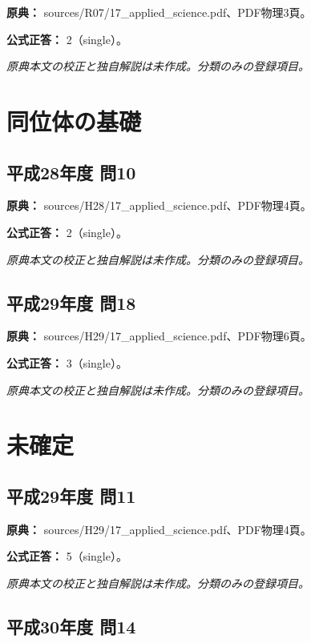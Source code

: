 \noindent\textbf{原典：} sources/R07/17\_applied\_science.pdf、PDF物理3頁。

\textbf{公式正答：} 2（single）。

\par\textit{原典本文の校正と独自解説は未作成。分類のみの登録項目。}

\section{同位体の基礎}

\subsection{平成28年度 問10}
\label{q:h28-reg-applied-10}

\noindent\textbf{原典：} sources/H28/17\_applied\_science.pdf、PDF物理4頁。

\textbf{公式正答：} 2（single）。

\par\textit{原典本文の校正と独自解説は未作成。分類のみの登録項目。}

\subsection{平成29年度 問18}
\label{q:h29-reg-applied-18}

\noindent\textbf{原典：} sources/H29/17\_applied\_science.pdf、PDF物理6頁。

\textbf{公式正答：} 3（single）。

\par\textit{原典本文の校正と独自解説は未作成。分類のみの登録項目。}

\section{未確定}

\subsection{平成29年度 問11}
\label{q:h29-reg-applied-11}

\noindent\textbf{原典：} sources/H29/17\_applied\_science.pdf、PDF物理4頁。

\textbf{公式正答：} 5（single）。

\par\textit{原典本文の校正と独自解説は未作成。分類のみの登録項目。}

\subsection{平成30年度 問14}
\label{q:h30-reg-applied-14}

